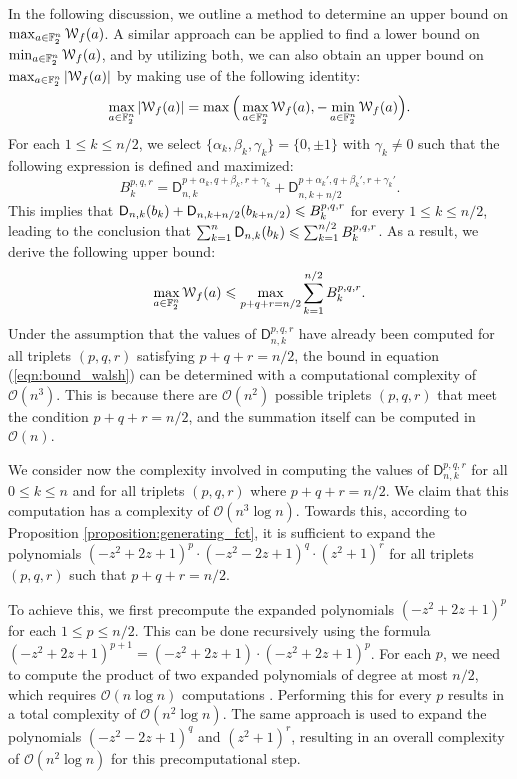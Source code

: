 \documentclass[11pt]{llncs}
\begin{document}
In the following discussion, we outline a method to determine an upper bound on $\max_{a\in\mathbb{F}_2^n}\mathcal W_{f}(a)$. A similar approach can be applied to find a lower bound on $\min_{a\in\mathbb{F}_2^n}\mathcal W_{f}(a)$, and by utilizing both, we can also obtain an upper bound on $\max_{a\in\mathbb{F}_2^n}|\mathcal W_{f}(a)|$ by making use of the following identity:
\[
\max_{a\in\mathbb{F}_2^n}|\mathcal W_{f}(a)|=\max\Big(\max_{a\in\mathbb{F}_2^n}\mathcal W_{f}(a),-\min_{a\in\mathbb{F}_2^n}\mathcal W_{f}(a)\Big).
\]
For each $1\leq k\leq n/2$, we select $\{\alpha_k,\beta_k,\gamma_k\}=\{0,\pm 1\}$ with $\gamma_k\neq 0$ such that the following expression is defined and maximized:
\[
B_k^{p,q,r}=\mathsf D_{n,k}^{p+\alpha_k,q+\beta_k,r+\gamma_k}+\mathsf D_{n,k+n/2}^{p+\alpha_k',q+\beta_k',r+\gamma_k'}.
\]
This implies that $\mathsf{D}_{n,k}(b_k)+\mathsf{D}_{n,k+n/2}(b_{k+n/2})\leqslant B_k^{p,q,r}$ for every $1\leq k\leq n/2$, leading to the conclusion that $\sum_{k=1}^n\mathsf{D}_{n,k}(b_k)\leqslant\sum_{k=1}^{n/2} B_k^{p,q,r}$. As a result, we derive the following upper bound:
\begin{equation}\label{eqn:bound_walsh}
\max_{a\in\mathbb{F}_2^n}\mathcal W_{f}(a)\leqslant\max_{p+q+r=n/2}\sum_{k=1}^{n/2} B_k^{p,q,r}.
\end{equation}
Under the assumption that the values of $\mathsf{D}_{n,k}^{p,q,r}$ have already been computed for all triplets $(p,q,r)$ satisfying $p+q+r=n/2$, the bound in equation (\ref{eqn:bound_walsh}) can be determined with a computational complexity of $\mathcal{O}(n^3)$. This is because there are $\mathcal{O}(n^2)$ possible triplets $(p,q,r)$ that meet the condition $p+q+r=n/2$, and the summation itself can be computed in $\mathcal{O}(n)$.

We consider now the complexity involved in computing the values of $\mathsf{D}_{n,k}^{p,q,r}$ for all $0 \leq k \leq n$ and for all triplets $(p,q,r)$ where $p+q+r=n/2$. We claim that this computation has a complexity of $\mathcal{O}(n^3 \log n)$. Towards this, according to Proposition \ref{proposition:generating_fct}, it is sufficient to expand the polynomials $(-z^2 + 2z + 1)^p \cdot (-z^2 - 2z + 1)^q \cdot (z^2 + 1)^r$ for all triplets $(p,q,r)$ such that $p+q+r=n/2$.

To achieve this, we first precompute the expanded polynomials $(-z^2 + 2z + 1)^p$ for each $1 \leq p \leq n/2$. This can be done recursively using the formula $(-z^2 + 2z + 1)^{p+1} = (-z^2 + 2z + 1) \cdot (-z^2 + 2z + 1)^p$. For each $p$, we need to compute the product of two expanded polynomials of degree at most $n/2$, which requires $\mathcal{O}(n \log n)$ computations . Performing this for every $p$ results in a total complexity of $\mathcal{O}(n^2 \log n)$. The same approach is used to expand the polynomials $(-z^2 - 2z + 1)^q$ and $(z^2 + 1)^r$, resulting in an overall complexity of $\mathcal{O}(n^2 \log n)$ for this precomputational step.
\end{document}
